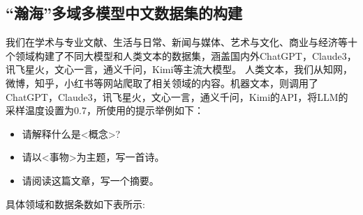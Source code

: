 \documentclass[a4paper]{report}
\begin{document}
\subsection{“瀚海”多域多模型中文数据集的构建}
我们在学术与专业文献、生活与日常、新闻与媒体、艺术与文化、商业与经济等十个领域构建了不同大模型和人类文本的数据集，涵盖国内外ChatGPT，Claude3，讯飞星火，文心一言，通义千问，Kimi等主流大模型。
人类文本，我们从知网，微博，知乎，小红书等网站爬取了相关领域的内容。机器文本，则调用了ChatGPT，Claude3，讯飞星火，文心一言，通义千问，Kimi的API，将LLM的采样温度设置为0.7，所使用的提示举例如下：
\begin{itemize}
	\item 请解释什么是<概念>?
	\item 请以<事物>为主题，写一首诗。
	\item 请阅读这篇文章，写一个摘要。
\end{itemize}
具体领域和数据条数如下表所示:
\end{document}
